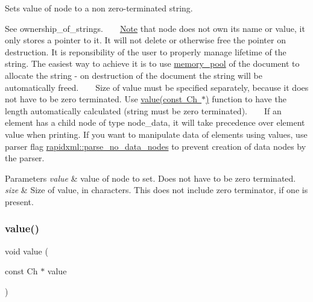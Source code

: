 Sets value of node to a non zero-\/terminated string. 

See ownership\+\_\+of\+\_\+strings. ~\newline
~\newline
 \mbox{\hyperlink{classNote}{Note}} that node does not own its name or value, it only stores a pointer to it. It will not delete or otherwise free the pointer on destruction. It is reponsibility of the user to properly manage lifetime of the string. The easiest way to achieve it is to use \mbox{\hyperlink{classrapidxml_1_1memory__pool}{memory\+\_\+pool}} of the document to allocate the string -\/ on destruction of the document the string will be automatically freed. ~\newline
~\newline
 Size of value must be specified separately, because it does not have to be zero terminated. Use \mbox{\hyperlink{classrapidxml_1_1xml__base_a18c7469acdca771de9b4f3054053029c}{value(const Ch $\ast$)}} function to have the length automatically calculated (string must be zero terminated). ~\newline
~\newline
 If an element has a child node of type node\+\_\+data, it will take precedence over element value when printing. If you want to manipulate data of elements using values, use parser flag \mbox{\hyperlink{namespacerapidxml_a87e8bbab53702cf3b438bd553c10b6b9}{rapidxml\+::parse\+\_\+no\+\_\+data\+\_\+nodes}} to prevent creation of data nodes by the parser. 
\begin{DoxyParams}{Parameters}
{\em value} & value of node to set. Does not have to be zero terminated. \\
\hline
{\em size} & Size of value, in characters. This does not include zero terminator, if one is present. \\
\hline
\end{DoxyParams}
\mbox{\label{classrapidxml_1_1xml__base_a18c7469acdca771de9b4f3054053029c}} 
\subsubsection{\texorpdfstring{value()}{value()}\hspace{0.1cm}{\footnotesize\ttfamily [3/3]}}
{\footnotesize\ttfamily void value (\begin{DoxyParamCaption}\item[{const Ch $\ast$}]{value }\end{DoxyParamCaption})\hspace{0.3cm}{\ttfamily [inline]}}



